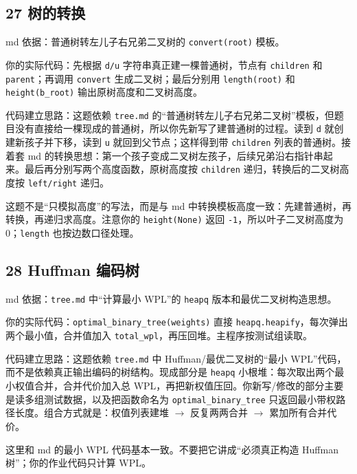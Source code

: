 \documentclass[10pt,a4paper,fontset=none]{ctexart}
\begin{document}
\subsection{27 树的转换}
\begin{sourcebox}
md 依据：普通树转左儿子右兄弟二叉树的 \texttt{convert(root)} 模板。
\end{sourcebox}
\begin{methodbox}
你的实际代码：先根据 \texttt{d/u} 字符串真正建一棵普通树，节点有 \texttt{children} 和 \texttt{parent}；再调用 \texttt{convert} 生成二叉树；最后分别用 \texttt{length(root)} 和 \texttt{height(b\_root)} 输出原树高度和二叉树高度。

代码建立思路：这题依赖 \texttt{tree.md} 的“普通树转左儿子右兄弟二叉树”模板，但题目没有直接给一棵现成的普通树，所以你先新写了建普通树的过程。读到 \texttt{d} 就创建新孩子并下移，读到 \texttt{u} 就回到父节点；这样得到带 \texttt{children} 列表的普通树。接着套 md 的转换思想：第一个孩子变成二叉树左孩子，后续兄弟沿右指针串起来。最后再分别写两个高度函数，原树高度按 \texttt{children} 递归，转换后的二叉树高度按 \texttt{left/right} 递归。
\end{methodbox}
这题不是“只模拟高度”的写法，而是与 md 中转换模板高度一致：先建普通树，再转换，再递归求高度。注意你的 \texttt{height(None)} 返回 \texttt{-1}，所以叶子二叉树高度为 0；\texttt{length} 也按边数口径处理。

\subsection{28 Huffman 编码树}
\begin{sourcebox}
md 依据：\texttt{tree.md} 中“计算最小 WPL”的 \texttt{heapq} 版本和最优二叉树构造思想。
\end{sourcebox}
\begin{methodbox}
你的实际代码：\texttt{optimal\_binary\_tree(weights)} 直接 \texttt{heapq.heapify}，每次弹出两个最小值，合并值加入 \texttt{total\_wpl}，再压回堆。主程序按测试组读取。

代码建立思路：这题依赖 \texttt{tree.md} 中 Huffman/最优二叉树的“最小 WPL”代码，而不是依赖真正输出编码的树结构。现成部分是 \texttt{heapq} 小根堆：每次取出两个最小权值合并，合并代价加入总 WPL，再把新权值压回。你新写/修改的部分主要是读多组测试数据，以及把函数命名为 \texttt{optimal\_binary\_tree} 只返回最小带权路径长度。组合方式就是：权值列表建堆 $\rightarrow$ 反复两两合并 $\rightarrow$ 累加所有合并代价。
\end{methodbox}
这里和 md 的最小 WPL 代码基本一致。不要把它讲成“必须真正构造 Huffman 树”；你的作业代码只计算 WPL。
\end{document}
